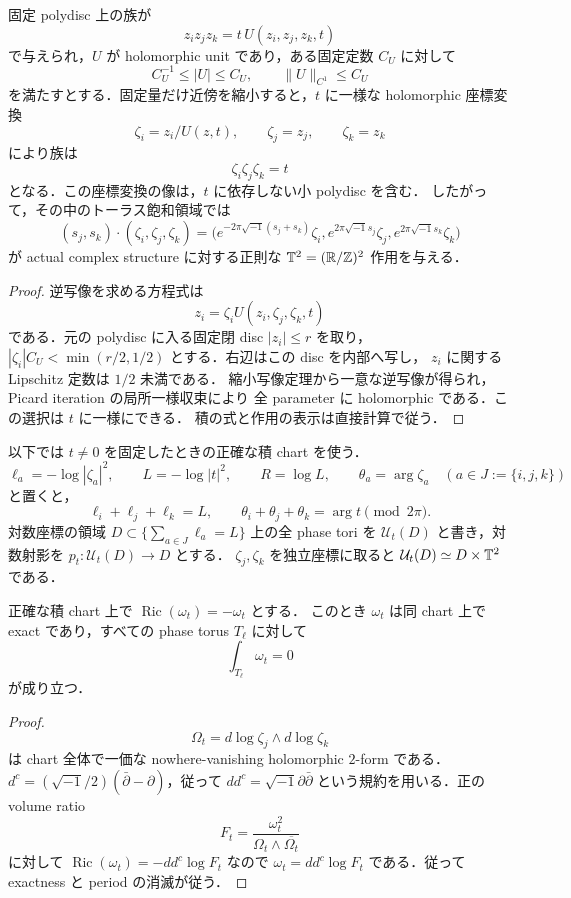 \begin{lemma}\label{ke:unit-removal}
固定 polydisc 上の族が
\[
 z_i z_j z_k=t\,U(z_i,z_j,z_k,t)
\]
で与えられ，$U$ が holomorphic unit であり，ある固定定数 $C_U$ に対して
\[
 C_U^{-1}\le |U|\le C_U,\qquad \|U\|_{C^1}\le C_U
\]
を満たすとする．固定量だけ近傍を縮小すると，$t$ に一様な holomorphic 座標変換
\[
 \zeta_i=z_i/U(z,t),\qquad \zeta_j=z_j,\qquad \zeta_k=z_k
\]
により族は
\begin{equation}\label{ke:eq:exact-product}
 \zeta_i\zeta_j\zeta_k=t
\end{equation}
となる．この座標変換の像は，$t$ に依存しない小 polydisc を含む．
したがって，その中のトーラス飽和領域では
\begin{equation}\label{ke:eq:phase-action}
 (s_j,s_k)\cdot(\zeta_i,\zeta_j,\zeta_k)
 =\bigl(e^{-2\pi\sqrt{-1}(s_j+s_k)}\zeta_i,
        e^{2\pi\sqrt{-1}s_j}\zeta_j,
        e^{2\pi\sqrt{-1}s_k}\zeta_k\bigr)
\end{equation}
が actual complex structure に対する正則な $\mathbb T^2=(\mathbb R/\mathbb Z)^2$ 作用を与える．
\end{lemma}
\begin{proof}
逆写像を求める方程式は
\[
 z_i=\zeta_i U(z_i,\zeta_j,\zeta_k,t)
\]
である．元の polydisc に入る固定閉 disc $|z_i|\le r$ を取り，
$|\zeta_i|C_U<\min(r/2,1/2)$ とする．右辺はこの disc を内部へ写し，
$z_i$ に関する Lipschitz 定数は $1/2$ 未満である．
縮小写像定理から一意な逆写像が得られ，Picard iteration の局所一様収束により
全 parameter に holomorphic である．この選択は $t$ に一様にできる．
積の式と作用の表示は直接計算で従う．
\end{proof}

以下では $t\ne0$ を固定したときの正確な積 chart を使う．
\begin{equation}\label{ke:eq:depth-convention}
 \ell_a=-\log|\zeta_a|^2,\qquad
 L=-\log|t|^2,\qquad R=\log L,\qquad
 \theta_a=\arg\zeta_a\quad(a\in J:=\{i,j,k\})
\end{equation}
と置くと，
\[
 \ell_i+\ell_j+\ell_k=L,\qquad
 \theta_i+\theta_j+\theta_k=\arg t\pmod {2\pi}.
\]
対数座標の領域 $D\subset\{\sum_{a\in J}\ell_a=L\}$ 上の全 phase tori を
$\mathcal U_t(D)$ と書き，対数射影を $p_t:\mathcal U_t(D)\to D$ とする．
$\zeta_j,\zeta_k$ を独立座標に取ると $\mathcal U_t(D)\simeq D\times\mathbb T^2$ である．

\begin{lemma}\label{ke:negative-exact}
正確な積 chart 上で $\operatorname{Ric}(\omega_t)=-\omega_t$ とする．
このとき $\omega_t$ は同 chart 上で exact であり，すべての phase torus $T_\ell$ に対して
\[
 \int_{T_\ell}\omega_t=0
\]
が成り立つ．
\end{lemma}
\begin{proof}
\[
 \Omega_t=d\log\zeta_j\wedge d\log\zeta_k
\]
は chart 全体で一価な nowhere-vanishing holomorphic $2$-form である．
$d^c=(\sqrt{-1}/2)(\bar\partial-\partial)$，従って $dd^c=\sqrt{-1}\partial\bar\partial$
という規約を用いる．正の volume ratio
\[
 F_t=\frac{\omega_t^2}{\Omega_t\wedge\overline{\Omega_t}}
\]
に対して $\operatorname{Ric}(\omega_t)=-dd^c\log F_t$ なので
$\omega_t=dd^c\log F_t$ である．従って exactness と period の消滅が従う．
\end{proof}


